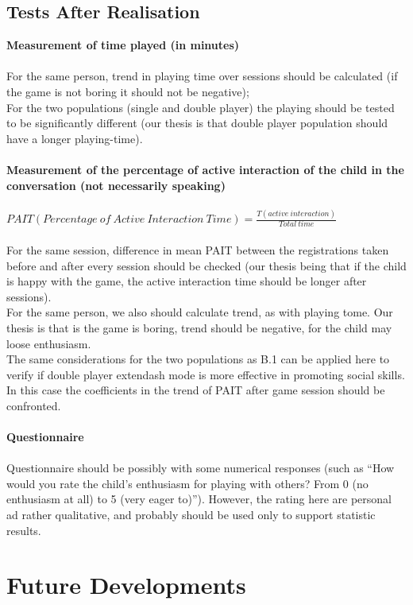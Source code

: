 \documentclass[a4paper,twoside]{book}
\begin{document}
\section{Tests After Realisation}

\textbf{Measurement of time played (in minutes)}
\\
\\
For the same person, trend in playing time over sessions should be calculated (if the game is not boring it should not be negative);
\\
For the two populations (single and double player) the playing should be tested to be significantly different (our thesis is that double player population should have a longer playing-time).
\\
\\
\textbf{Measurement of the percentage of active interaction of the child in the conversation (not necessarily speaking)}
\\
\\
$PAIT (Percentage\ of\ Active\ Interaction\ Time)=\frac{T(active\ interaction)}{Total\ time}$
\\
\\
For the same session, difference in mean PAIT between the registrations taken before and after every session should be checked (our thesis being that if the child is happy with the game, the active interaction time should be longer after sessions).
\\
For the same person, we also should calculate trend, as with playing tome. Our thesis is that is the game is boring, trend should be negative, for the child may loose enthusiasm.
\\
The same considerations for the two populations as B.1 can be applied here to verify if double player	extendash mode is more effective in promoting social skills. In this case the coefficients in the trend of PAIT after game session should be confronted.
\\
\\
\textbf{Questionnaire}
\\
\\
Questionnaire should be possibly with some numerical responses (such as \textquotedblleft How would you rate the child's enthusiasm for playing with others? From 0 (no enthusiasm at all) to 5 (very eager to)\textquotedblright). However, the rating here are personal ad rather qualitative, and probably should be used only to support statistic results.

\chapter{Future Developments}
\end{document}
